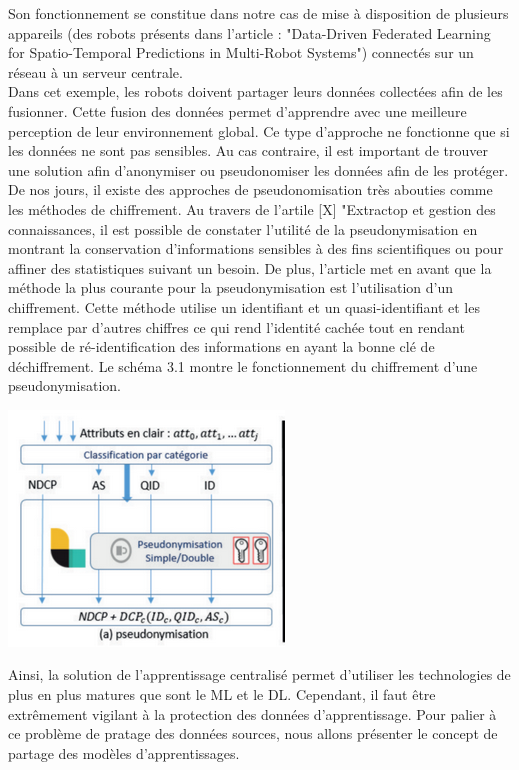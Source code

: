 \documentclass[12pt,a4paper]{report}
\begin{document}
Son fonctionnement se constitue dans notre cas de mise à disposition de plusieurs appareils (des robots présents dans l'article : "Data-Driven Federated Learning for Spatio-Temporal Predictions in Multi-Robot Systems") connectés sur un réseau à un serveur centrale.\\

Dans cet exemple, les robots doivent partager leurs données collectées afin de les fusionner. Cette fusion des données permet d’apprendre avec une meilleure perception de leur environnement global. Ce type d’approche ne fonctionne que si les données ne sont pas sensibles. Au cas contraire, il est important de trouver une solution afin d'anonymiser ou pseudonomiser les données afin de les protéger.\\

De nos jours, il existe des approches de pseudonomisation très abouties comme les méthodes de chiffrement. Au travers de l’artile [X]  "Extractop et gestion des connaissances, il est possible de constater l'utilité de la pseudonymisation en montrant la conservation d'informations sensibles à des fins scientifiques ou pour affiner des statistiques suivant un besoin. De plus, l’article met en avant que la méthode la plus courante pour la pseudonymisation est l'utilisation d'un chiffrement. 
Cette méthode utilise un identifiant et un quasi-identifiant et les remplace par d'autres chiffres ce qui rend l'identité cachée tout en rendant possible de ré-identification des informations en ayant la bonne clé de déchiffrement. Le schéma 3.1 montre le fonctionnement du chiffrement d'une pseudonymisation.\\

\begin{center}
    \includegraphics[scale=0.7]{pseudo}
    \label{fig1}
\end{center} 

Ainsi, la solution de l’apprentissage centralisé permet d’utiliser les technologies de plus en plus matures que sont le ML et le DL. Cependant, il faut être extrêmement vigilant à la protection des données d'apprentissage. Pour palier à ce problème de pratage des données sources, nous allons présenter le concept de partage des modèles d’apprentissages.
\pagebreak
\end{document}
